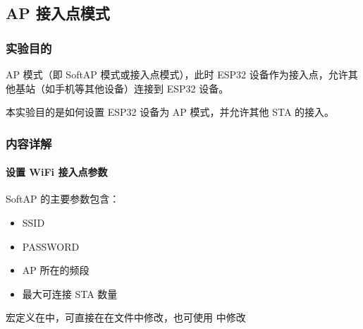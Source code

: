 \documentclass[a4paper,12pt,english]{sphinxmanual}
\begin{document}
{{\sphinxstepscope


\subsection{AP 接入点模式}
\label{\detokenize{exp-esp32/wifi/ap:ap}}\label{\detokenize{exp-esp32/wifi/ap::doc}}

\subsubsection{实验目的}
\label{\detokenize{exp-esp32/wifi/ap:id1}}
\sphinxAtStartPar
AP 模式（即 Soft\sphinxhyphen{}AP 模式或接入点模式），此时 ESP32 设备作为接入点，允许其他基站（如手机等其他设备）连接到 ESP32 设备。

\sphinxAtStartPar
本实验目的是如何设置 ESP32 设备为 AP 模式，并允许其他 STA 的接入。


\subsubsection{内容详解}
\label{\detokenize{exp-esp32/wifi/ap:id2}}

\paragraph{设置 WiFi 接入点参数}
\label{\detokenize{exp-esp32/wifi/ap:wifi}}
\sphinxAtStartPar
SoftAP 的主要参数包含：
\begin{itemize}
\item {} 
\sphinxAtStartPar
SSID

\item {} 
\sphinxAtStartPar
PASSWORD

\item {} 
\sphinxAtStartPar
AP 所在的频段

\item {} 
\sphinxAtStartPar
最大可连接 STA 数量

\end{itemize}

\sphinxAtStartPar
宏定义在中，可直接在在文件中修改，也可使用 中修改

\begin{sphinxVerbatim}[commandchars=\\\{\}]
\end{sphinxVerbatim}

}}
\end{document}
